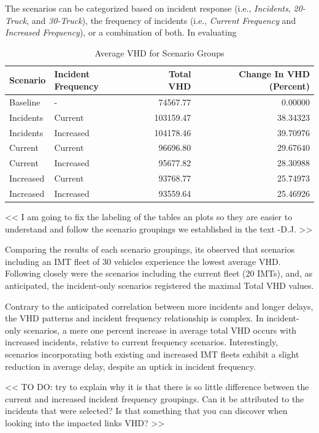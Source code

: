 \documentclass[fancy, oneside, mastersfancy, ms]{byuthesis}
\begin{document}
The scenarios can be categorized based on incident response (i.e.,
\emph{Incidents}, \emph{20-Truck}, and \emph{30-Truck}), the frequency
of incidents (i.e., \emph{Current Frequency} and \emph{Increased
Frequency}), or a combination of both. In evaluating

\hypertarget{tbl-network_delays_table}{}
\begin{table}
\caption{\label{tbl-network_delays_table}Average VHD for Scenario Groups }\tabularnewline

\centering
\begin{tabular}[t]{llrr}
\toprule
Scenario & Incident Frequency & Total VHD & Change In VHD (Percent)\\
\midrule
Baseline & - & 74567.77 & 0.00000\\
Incidents & Current & 103159.47 & 38.34323\\
Incidents & Increased & 104178.46 & 39.70976\\
Current & Current & 96696.80 & 29.67640\\
Current & Increased & 95677.82 & 28.30988\\
\addlinespace
Increased & Current & 93768.77 & 25.74973\\
Increased & Increased & 93559.64 & 25.46926\\
\bottomrule
\end{tabular}
\end{table}

\textless\textless{} I am going to fix the labeling of the tables an
plots so they are easier to understand and follow the scenario groupings
we established in the text -D.J. \textgreater\textgreater{}

Comparing the results of each scenario groupings, its observed that
scenarios including an IMT fleet of 30 vehicles experience the lowest
average VHD. Following closely were the scenarios including the current
fleet (20 IMTs), and, as anticipated, the incident-only scenarios
registered the maximal Total VHD values.

Contrary to the anticipated correlation between more incidents and
longer delays, the VHD patterns and incident frequency relationship is
complex. In incident-only scenarios, a mere one percent increase in
average total VHD occurs with increased incidents, relative to current
frequency scenarios. Interestingly, scenarios incorporating both
existing and increased IMT fleets exhibit a slight reduction in average
delay, despite an uptick in incident frequency.

\textless\textless{} TO DO: try to explain why it is that there is so
little difference between the current and increased incident frequency
groupings. Can it be attributed to the incidents that were selected? Is
that something that you can discover when looking into the impacted
links VHD? \textgreater\textgreater{}
\end{document}
